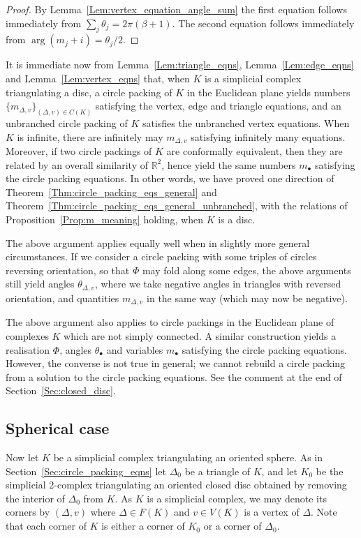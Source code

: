 \documentclass[12pt]{amsart}
\numberwithin{equation}{section}
\theoremstyle{named}
\newcommand{\refsec}[1]{Section~\ref{Sec:#1}}
\newcommand{\reflem}[1]{Lemma~\ref{Lem:#1}}
\newcommand{\refprop}[1]{Proposition~\ref{Prop:#1}}
\newcommand{\refthm}[1]{Theorem~\ref{Thm:#1}}
\newcommand{\R}{\mathbb{R}}
\begin{document}
\begin{proof}
By \reflem{vertex_equation_angle_sum} the first equation follows immediately from $\sum_j \theta_j = 2\pi (\beta+1)$. The second equation follows immediately from $\arg (m_j + i) = \theta_j / 2$.
\end{proof}

It is immediate now from \reflem{triangle_eqns}, \reflem{edge_eqns} and \reflem{vertex_eqns} that, when $K$ is a simplicial complex triangulating a disc, a circle packing of $K$ in the Euclidean plane yields numbers $\{m_{\Delta,v}\}_{(\Delta,v) \in C(K)}$ satisfying the vertex, edge and triangle equations, and an unbranched circle packing of $K$ satisfies the unbranched vertex equations. When $K$ is infinite, there are infinitely may $m_{\Delta,v}$ satisfying infinitely many equations. Moreover, if two circle packings of $K$ are conformally equivalent, then they are related by an overall similarity of $\R^2$, hence yield the same numbers $m_\bullet$ satisfying the circle packing equations. In other words, we have proved one direction of \refthm{circle_packing_eqs_general} and \refthm{circle_packing_eqs_general_unbranched}, with the relations of \refprop{m_meaning} holding, when $K$ is a disc. 

 The above argument applies equally well when in slightly more general circumstances. If we consider a circle packing with some triples of circles reversing orientation, so that $\Phi$ may fold along some edges, the above arguments still yield angles $\theta_{\Delta,v}$, where we take negative angles in triangles with reversed orientation, and quantities $m_{\Delta,v}$ in the same way (which may now be negative). 

The above argument also applies to circle packings in the Euclidean plane of complexes $K$ which are not simply connected. A similar construction yields a realisation $\Phi$, angles $\theta_\bullet$ and variables $m_\bullet$ satisfying the circle packing equations. However, the converse is not true in general; we cannot rebuild a circle packing from a solution to the circle packing equations. See the comment at the end of \refsec{closed_disc}.

\subsection{Spherical case}
\label{Sec:spherical_case_eqns}

 Now let $K$ be a simplicial complex triangulating an oriented sphere. As in \refsec{circle_packing_eqns} let $\Delta_0$ be a triangle of $K$, and let $K_0$ be the simplicial 2-complex triangulating an oriented closed disc obtained by removing the interior of $\Delta_0$ from $K$. As $K$ is a simplicial complex, we may denote its corners by $(\Delta,v)$ where $\Delta \in F(K)$ and $v \in V(K)$ is a vertex of $\Delta$. Note that each corner of $K$ is either a corner of $K_0$ or a corner of $\Delta_0$. 
\end{document}
